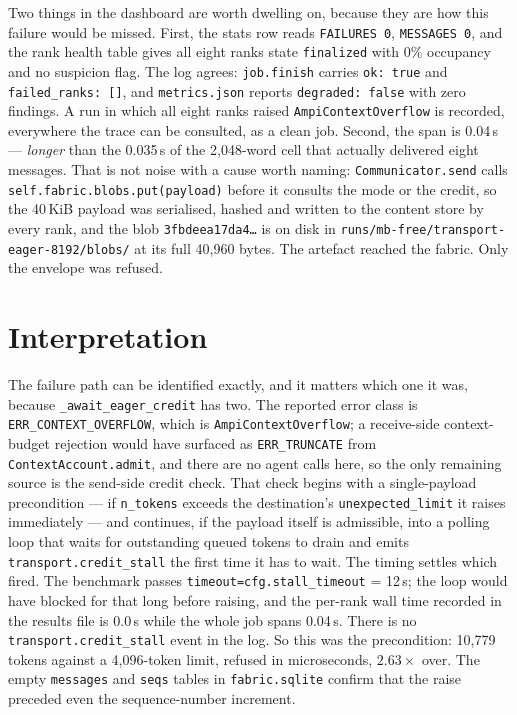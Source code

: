 \documentclass[11pt]{article}
\begin{document}
Two things in the dashboard are worth dwelling on, because they are how this failure
would be missed. First, the stats row reads \texttt{FAILURES 0}, \texttt{MESSAGES 0},
and the rank health table gives all eight ranks state \texttt{finalized} with 0\%
occupancy and no suspicion flag. The log agrees: \texttt{job.finish} carries
\texttt{ok: true} and \texttt{failed\_ranks: []}, and \texttt{metrics.json} reports
\texttt{degraded: false} with zero findings. A run in which all eight ranks raised
\texttt{AmpiContextOverflow} is recorded, everywhere the trace can be consulted, as a
clean job. Second, the span is 0.04\,s --- \emph{longer} than the 0.035\,s of the
2{,}048-word cell that actually delivered eight messages. That is not noise with a
cause worth naming: \texttt{Communicator.send} calls
\texttt{self.fabric.blobs.put(payload)} before it consults the mode or the credit, so
the 40\,KiB payload was serialised, hashed and written to the content store by every
rank, and the blob \texttt{3fbdeea17da4\ldots} is on disk in
\texttt{runs/mb-free/transport-eager-8192/blobs/} at its full 40{,}960 bytes. The
artefact reached the fabric. Only the envelope was refused.

\section{Interpretation}

The failure path can be identified exactly, and it matters which one it was, because
\texttt{\_await\_eager\_credit} has two. The reported error class is
\texttt{ERR\_CONTEXT\_OVERFLOW}, which is \texttt{AmpiContextOverflow}; a receive-side
context-budget rejection would have surfaced as \texttt{ERR\_TRUNCATE} from
\texttt{ContextAccount.admit}, and there are no agent calls here, so the only
remaining source is the send-side credit check. That check begins with a single-payload
precondition --- if \texttt{n\_tokens} exceeds the destination's
\texttt{unexpected\_limit} it raises immediately --- and continues, if the payload
itself is admissible, into a polling loop that waits for outstanding queued tokens to
drain and emits \texttt{transport.credit\_stall} the first time it has to wait. The
timing settles which fired. The benchmark passes \texttt{timeout=cfg.stall\_timeout}
= 12\,s; the loop would have blocked for that long before raising, and the per-rank
wall time recorded in the results file is 0.0\,s while the whole job spans 0.04\,s.
There is no \texttt{transport.credit\_stall} event in the log. So this was the
precondition: 10{,}779 tokens against a 4{,}096-token limit, refused in microseconds,
$2.63\times$ over. The empty \texttt{messages} and \texttt{seqs} tables in
\texttt{fabric.sqlite} confirm that the raise preceded even the sequence-number
increment.
\end{document}
